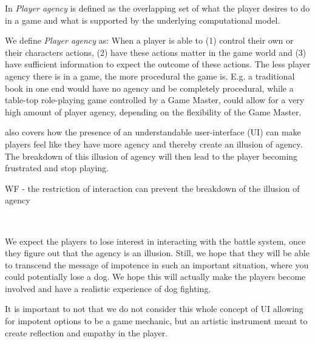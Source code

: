 In \citep{wardrip2009agency} \textit{Player agency} is defined as the overlapping set of what the player desires to do in a game and what is supported by the underlying computational model.\

We define \textit{Player agency} as: When a player is able to (1) control their own or their characters actions, (2) have these actions matter in the game world and (3) have sufficient information to expect the outcome of these actions. The less player agency there is in a game, the more procedural the game is. E.g. a traditional book in one end would have no agency and be completely procedural, while a table-top role-playing game controlled by a Game Master, could allow for a very high amount of player agency, depending on the flexibility of the Game Master.\

\citep{wardrip2009agency} also covers how the presence of an understandable user-interface (UI) can make players feel like they have more agency and thereby create an illusion of agency. The breakdown of this illusion of agency will then lead to the player becoming frustrated and stop playing.\

WF - the restriction of interaction can prevent the breakdown of the illusion of agency\
\

\


We expect the players to lose interest in interacting with the battle system, once they figure out that the agency is an illusion. Still, we hope that they will be able to transcend the message of impotence in such an important situation, where you could potentially lose a dog. 
We hope this will actually make the players become involved and have a realistic experience of dog fighting. \

It is important to not that we do not consider this whole concept of UI allowing for impotent options to be a game mechanic, but an artistic instrument meant to create reflection and empathy in the player. \

